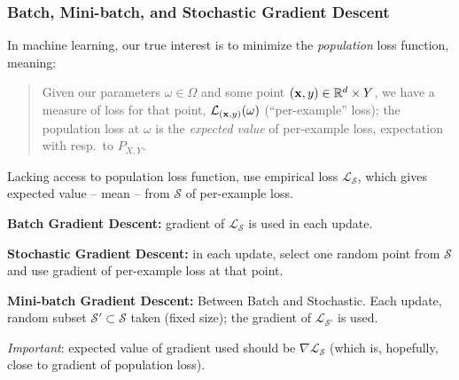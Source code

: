 \documentclass{beamer}
\theoremstyle{example}
\begin{document}
\begin{frame}
    \frametitle{Batch, Mini-batch, and Stochastic Gradient Descent}
    In machine learning, our true interest is to minimize the \textit{population} loss function, meaning: \newline 
    \pause
    \begin{quote}
        Given our parameters $\omega\in\Omega$ and some point $({\bf x},y) \in \mathbb R^d\times Y$, we have a measure of loss for that point, $\mathcal L_{({\bf x},y)}(\omega)$ (``per-example'' loss); the population loss at $\omega$ is the \emph{expected value} of per-example loss, expectation with resp.~to $P_{X,Y}$.
    \end{quote}
    \pause
    Lacking access to population loss function, use empirical loss $\mathcal L_{\mathcal S}$, which gives expected value {--} mean {--} from $\mathcal S$ of per-example loss.

    \pause
    \textbf{Batch Gradient Descent:} gradient of $\mathcal L_{\mathcal S}$ is used in each update. 

    \pause
    \textbf{Stochastic Gradient Descent:} in each update, select one random point from $\mathcal S$ and use gradient of per-example loss at that point.

    \pause
    \textbf{Mini-batch Gradient Descent:} Between Batch and Stochastic. Each update, random subset $\mathcal S' \subset \mathcal S$ taken (fixed size); the gradient of $\mathcal L_{\mathcal S'}$ is used.

    \pause
    \emph{Important}: expected value of gradient used should be $\nabla\mathcal L_{\mathcal S}$ (which is, hopefully, close to gradient of population loss).
        
\end{frame}
    
\end{document}
